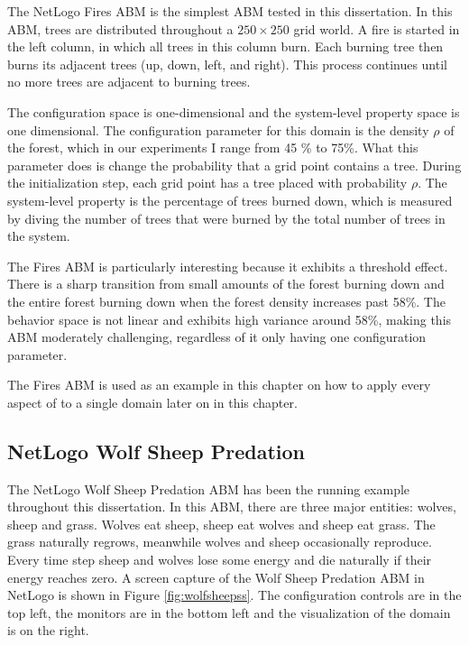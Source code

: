 The NetLogo Fires ABM is the simplest ABM tested in this dissertation.
In this ABM, trees are distributed throughout a $250 \times 250$ grid world.
A fire is started in the left column, in which all trees in this column burn.
Each burning tree then burns its adjacent trees (up, down, left, and right).
This process continues until no more trees are adjacent to burning trees.

The configuration space is one-dimensional and the system-level property space is one dimensional.
The configuration parameter for this domain is the density $\rho$ of the forest, which in our experiments I range from 45 \% to 75\%.
What this parameter does is change the probability that a grid point contains a tree.
During the initialization step, each grid point has a tree placed with probability $\rho$.
The system-level property is the percentage of trees burned down, which is measured by diving the number of trees that were burned by the total number of trees in the system.


The Fires ABM is particularly interesting because it exhibits a threshold effect.
There is a sharp transition from small amounts of the forest burning down and the entire forest burning down when the forest density increases past 58\%.
The behavior space is not linear and exhibits high variance around 58\%, making this ABM moderately challenging, regardless of it only having one configuration parameter.

The Fires ABM is used as an example in this chapter on how to apply every aspect of \fw to a single domain later on in this chapter.


 \subsection{NetLogo Wolf Sheep Predation}
The NetLogo Wolf Sheep Predation ABM has been the running example throughout this dissertation.
In this ABM, there are three major entities: wolves, sheep and grass.
Wolves eat sheep, sheep eat wolves and sheep eat grass.
The grass naturally regrows, meanwhile wolves and sheep occasionally reproduce.
Every time step sheep and wolves lose some energy and die naturally if their energy reaches zero.
A screen capture of the Wolf Sheep Predation ABM in NetLogo is shown in Figure \ref{fig:wolfsheepss}.
The configuration controls are in the top left, the monitors are in the bottom left and the visualization of the domain is on the right.


